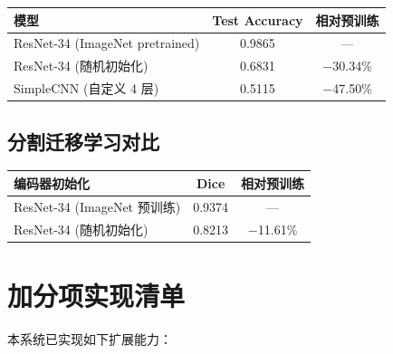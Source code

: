 \documentclass[12pt, a4paper, openany]{ctexbook}
\begin{document}
\begin{center}
\begin{tabular}{lcc}
  \toprule
  \textbf{模型} & \textbf{Test Accuracy} & \textbf{相对预训练} \\
  \midrule
  ResNet-34 (ImageNet pretrained)    & 0.9865 & — \\
  ResNet-34 (随机初始化)              & 0.6831 & $-$30.34\% \\
  SimpleCNN (自定义 4 层)             & 0.5115 & $-$47.50\% \\
  \bottomrule
\end{tabular}
\end{center}

\section{分割迁移学习对比}

\begin{center}
\begin{tabular}{lcc}
  \toprule
  \textbf{编码器初始化} & \textbf{Dice} & \textbf{相对预训练} \\
  \midrule
  ResNet-34 (ImageNet 预训练)  & 0.9374 & — \\
  ResNet-34 (随机初始化)        & 0.8213 & $-$11.61\% \\
  \bottomrule
\end{tabular}
\end{center}

\chapter{加分项实现清单}

本系统已实现如下扩展能力：
\end{document}
